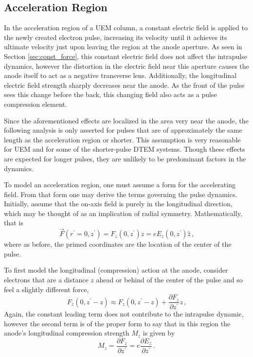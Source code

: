 
\subsection{Acceleration Region} \label{sec:gun_model}

In the acceleration region of a UEM column, a constant electric field is applied to the newly created electron pulse, increasing its velocity until it achieves its ultimate velocity just upon leaving the region at the anode aperture.
As seen in Section \ref{sec:const_force}, this constant electric field does not affect the intrapulse dynamics, however the distortion in the electric field near this aperture causes the anode itself to act as a negative transverse lens. %
Additionally, the longitudinal electric field strength sharply decreases near the anode.
As the front of the pulse sees this change before the back, this changing field also acts as a pulse compression element.

Since the aforementioned effects are localized in the area very near the anode, the following analysis is only asserted for pulses that are of approximately the same length as the acceleration region or shorter.
This assumption is very reasonable for UEM and for some of the shorter-pulse DTEM systems.
Though these effects are expected for longer pulses, they are unlikely to be predominant factors in the dynamics.

To model an acceleration region, one must assume a form for the accelerating field.
From that form one may derive the terms governing the pulse dynamics. Initially, assume that the on-axis field is purely in the longitudinal direction, which may be thought of as an implication of radial symmetry.
Mathematically, that is
\begin{equation}
  \vec{F}(r^{\prime}=0,z^{\prime}) = F_z (0,z^{\prime}) \hat{z} = e E_z (0,z^{\prime}) \hat{z} \,\text{,}
\end{equation}
where as before, the primed coordinates are the location of the center of the pulse.

To first model the longitudinal (compression) action at the anode, %
consider electrons that are a distance $z$ ahead or behind of the center of the pulse and so feel a slightly different force, 
\begin{equation}
  F_z(0,z^{\prime} - z) \approx F_z(0,z^{\prime} - z) + \frac{\partial F_z}{\partial z^{\prime}} z \,\text{,}
\end{equation}
Again, the constant leading term does not contribute to the intrapulse dynamic, however the second term is of the proper form to say that in this region the anode's longitudinal compression strength $M_z$ is given by
\begin{equation}
  M_z = \frac{\partial F_z}{\partial z^{\prime}} = e \frac{\partial E_z}{\partial z^{\prime}} \, \text{.}
\end{equation}

